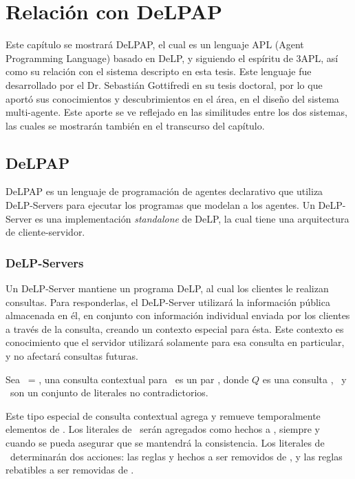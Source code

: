 
\chapter{Relación con DeLPAP}

Este capítulo se mostrará DeLPAP, el cual es un lenguaje APL (Agent Programming 
Language) basado en DeLP, y siguiendo el espíritu de 3APL,
así como su relación con el sistema descripto en esta tesis. Este lenguaje fue
desarrollado por el Dr. Sebastián Gottifredi en su tesis doctoral, por lo que 
aportó sus conocimientos y descubrimientos en el área, en el diseño del sistema
multi-agente. Este aporte se ve reflejado en las similitudes entre los dos 
sistemas, las cuales se mostrarán también en el transcurso del capítulo.

\section{DeLPAP}

DeLPAP es un lenguaje de programación de agentes declarativo que utiliza 
DeLP-Servers para ejecutar los programas que modelan a los agentes. Un 
DeLP-Server es una implementación \textit{standalone} de DeLP, la cual 
tiene una arquitectura de cliente-servidor. 

\subsection{DeLP-Servers}
Un DeLP-Server mantiene un programa DeLP, al cual los clientes le realizan consultas. 
Para responderlas, el DeLP-Server utilizará la información pública almacenada 
en él, en conjunto con información individual enviada por los clientes a 
través de la consulta, creando un contexto especial para ésta. Este contexto 
es conocimiento que el servidor utilizará solamente para esa consulta en particular, y no afectará consultas futuras.

\begin{definicion}
Sea \PP\ = \SD, una consulta contextual para \PP\ es un par 
, donde $Q$ es una consulta \DLP, \addset\ y 
\remset\ son un conjunto de literales no contradictorios.
\end{definicion}

Este tipo especial de consulta contextual agrega y remueve temporalmente
elementos de \PP. Los literales de \addset\ serán agregados como hechos a 
\SSet, siempre y cuando se pueda asegurar que se mantendrá la consistencia.
Los literales de \remset\ determinarán dos acciones: las reglas y hechos a ser 
removidos de \SSet, y las reglas rebatibles a ser removidas de \DD.

